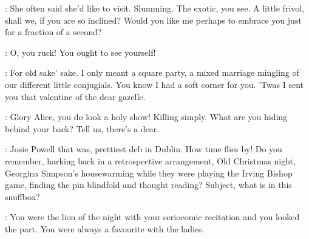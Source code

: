 \Bloom:
She often said she'd like to visit.
Slumming.
The exotic, you see.
% 
% 
% 
%
A little frivol, shall we, if you are so inclined?
Would you like me perhaps to embrace you
just for a fraction of a second?

\MrsBreen:
O, you ruck! You ought to see yourself!

\Bloom:
For old sake' sake.
I only meant a square party, a mixed marriage
mingling of our different little conjugials.
You know I had a soft corner for you.
'Twas I sent you that valentine of the dear gazelle.

\MrsBreen:
Glory Alice, you do look a holy show!
Killing simply.
What are you hiding behind your back?
Tell us, there's a dear.

\Bloom:
Josie Powell that was, prettiest deb in Dublin.
How time flies by!
Do you remember, harking back
in a retrospective arrangement, Old Christmas night,
Georgina Simpson's housewarming while they were playing the Irving Bishop game,
finding the pin blindfold and thought reading?
Subject, what is in this snuffbox?

\MrsBreen:
You were the lion of the night
with your seriocomic recitation and you looked the part.
You were always a favourite with the ladies.

